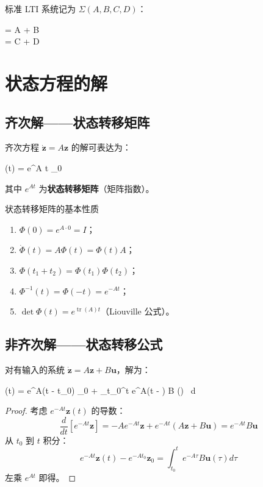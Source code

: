 标准 LTI 系统记为 $\Sigma(A, B, C, D)$：
\begin{myformula}
	\begin{cases}
		 = A  + B  \\
		 = C  + D 
	\end{cases}
\end{myformula}

\section{状态方程的解}

\subsection{齐次解——状态转移矩阵}

齐次方程 $\dot{\mathbf{z}} = A \mathbf{z}$ 的解可表达为：
\begin{myformula}
	(t) = e^{A t} _0
\end{myformula}
其中 $e^{At}$ 为\textbf{状态转移矩阵}（矩阵指数）。

\begin{theorem}{状态转移矩阵的基本性质}
	\begin{enumerate}
		\item $\Phi(0) = e^{A \cdot 0} = I$；
		\item $\dot{\Phi}(t) = A \Phi(t) = \Phi(t) A$；
		\item $\Phi(t_1 + t_2) = \Phi(t_1) \Phi(t_2)$；
		\item $\Phi^{-1}(t) = \Phi(-t) = e^{-At}$；
		\item $\det \Phi(t) = e^{\operatorname{tr}(A) t}$（Liouville 公式）。
	\end{enumerate}
\end{theorem}

\subsection{非齐次解——状态转移公式}

对有输入的系统 $\dot{\mathbf{z}} = A\mathbf{z} + B\mathbf{u}$，解为：
\begin{myformula}
	(t) = e^{A(t - t_0)} _0 + \int_{t_0}^{t} e^{A(t - \tau)} B (\tau) \, d\tau
\end{myformula}

\begin{proof}
	考虑 $e^{-At} \mathbf{z}(t)$ 的导数：
	\[
	\frac{d}{dt}\left[ e^{-At} \mathbf{z} \right] = -A e^{-At} \mathbf{z} + e^{-At} (A\mathbf{z} + B\mathbf{u}) = e^{-At} B \mathbf{u}
	\]
	从 $t_0$ 到 $t$ 积分：
	\[
	e^{-At} \mathbf{z}(t) - e^{-A t_0} \mathbf{z}_0 = \int_{t_0}^{t} e^{-A\tau} B \mathbf{u}(\tau) d\tau
	\]
	左乘 $e^{At}$ 即得。
\end{proof}

